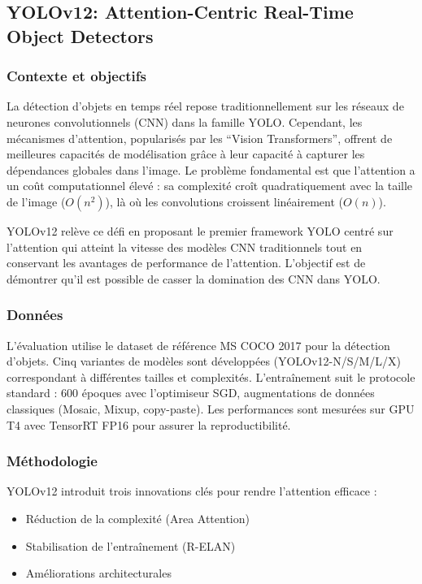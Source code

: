 \subsection{YOLOv12: Attention-Centric Real-Time Object Detectors}

\subsubsection{Contexte et objectifs}
La détection d'objets en temps réel repose traditionnellement sur les réseaux de neurones convolutionnels (CNN) dans la famille YOLO. Cependant, les mécanismes d'attention, popularisés par les ``Vision Transformers'', offrent de meilleures capacités de modélisation grâce à leur capacité à capturer les dépendances globales dans l'image. Le problème fondamental est que l'attention a un coût computationnel élevé : sa complexité croît quadratiquement avec la taille de l'image ($O(n^2)$), là où les convolutions croissent linéairement ($O(n)$). 

YOLOv12 relève ce défi en proposant le premier framework YOLO centré sur l'attention qui atteint la vitesse des modèles CNN traditionnels tout en conservant les avantages de performance de l'attention. L'objectif est de démontrer qu'il est possible de casser la domination des CNN dans YOLO.

\subsubsection{Données}
L'évaluation utilise le dataset de référence MS COCO 2017 \cite{coco_coco_nodate} pour la détection d'objets. Cinq variantes de modèles sont développées (YOLOv12-N/S/M/L/X) correspondant à différentes tailles et complexités. L'entraînement suit le protocole standard : 600 époques avec l'optimiseur SGD, augmentations de données classiques (Mosaic, Mixup, copy-paste). Les performances sont mesurées sur GPU T4 avec TensorRT FP16 pour assurer la reproductibilité.

\subsubsection{Méthodologie}
YOLOv12 introduit trois innovations clés pour rendre l'attention efficace :
\begin{itemize}
    \item Réduction de la complexité (Area Attention)
    \item Stabilisation de l'entraînement (R-ELAN)
    \item Améliorations architecturales
\end{itemize}

